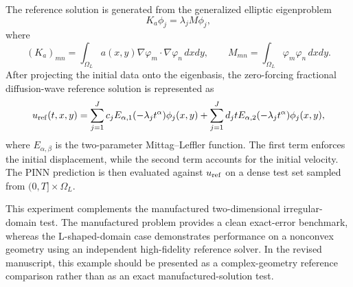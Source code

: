 The reference solution is generated from the generalized elliptic eigenproblem
\begin{equation}
    K_a \phi_j = \lambda_j M \phi_j,
\end{equation}
where
\begin{equation}
    (K_a)_{mn}=\int_{\Omega_L} a(x,y)\nabla\varphi_m\cdot\nabla\varphi_n\,dxdy,
    \qquad
    M_{mn}=\int_{\Omega_L}\varphi_m\varphi_n\,dxdy .
\end{equation}
After projecting the initial data onto the eigenbasis, the zero-forcing fractional diffusion-wave reference solution is represented as
\begin{equation}
    u_{\rm ref}(t,x,y)
    =\sum_{j=1}^{J} c_j E_{\alpha,1}(-\lambda_j t^\alpha)\phi_j(x,y)
    +\sum_{j=1}^{J} d_j t E_{\alpha,2}(-\lambda_j t^\alpha)\phi_j(x,y),
\end{equation}
where $E_{\alpha,\beta}$ is the two-parameter Mittag--Leffler function.  The first term enforces the initial displacement, while the second term accounts for the initial velocity.  The PINN prediction is then evaluated against $u_{\rm ref}$ on a dense test set sampled from $(0,T]\times\Omega_L$.

This experiment complements the manufactured two-dimensional irregular-domain test.  The manufactured problem provides a clean exact-error benchmark, whereas the L-shaped-domain case demonstrates performance on a nonconvex geometry using an independent high-fidelity reference solver.  In the revised manuscript, this example should be presented as a complex-geometry reference comparison rather than as an exact manufactured-solution test.
